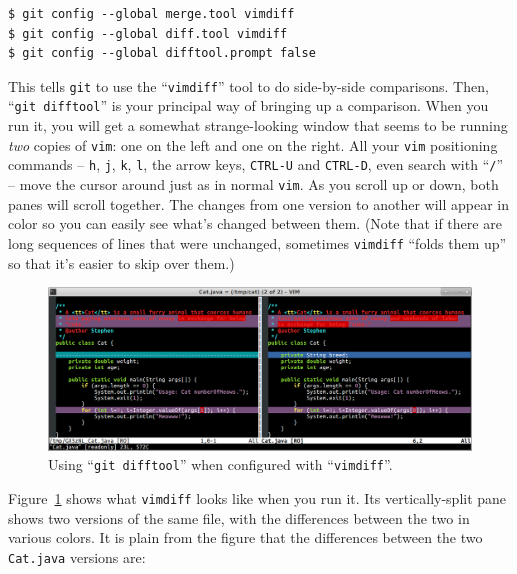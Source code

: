 \begin{Verbatim}[fontsize=\small,samepage=true,frame=none]
$ git config --global merge.tool vimdiff
$ git config --global diff.tool vimdiff
$ git config --global difftool.prompt false
\end{Verbatim}
\vspace{-.15in}

This tells \texttt{git} to use the ``\texttt{vimdiff}'' tool to do
side-by-side comparisons. Then, ``\texttt{git difftool}'' is your principal
way of bringing up a comparison. When you run it, you will get a somewhat
strange-looking window that seems to be running \textit{two} copies of
\texttt{vim}: one on the left and one on the right. All your \texttt{vim}
positioning commands -- \texttt{h}, \texttt{j}, \texttt{k}, \texttt{l}, the
arrow keys, \texttt{CTRL-U} and \texttt{CTRL-D}, even search with
``\texttt{/}'' -- move the cursor around just as in normal \texttt{vim}. As
you scroll up or down, both panes will scroll together. The changes from one
version to another will appear in color so you can easily see what's changed
between them. (Note that if there are long sequences of lines that were
unchanged, sometimes \texttt{vimdiff} ``folds them up'' so that it's easier to
skip over them.) 

\begin{figure}
\centering
\hspace*{-.2in}
\includegraphics[width=1.05\textwidth]{catDiff.png}
\vspace{-.05in}
\caption{Using ``\texttt{git difftool}'' when configured with ``\texttt{vimdiff}''.}
\label{fig:catDiff}
\end{figure}

Figure~\ref{fig:catDiff} shows what \texttt{vimdiff} looks like when you run
it. Its vertically-split pane shows two versions of the same file, with the
differences between the two in various colors. It is plain from the figure
that the differences between the two \texttt{Cat.java} versions are:

